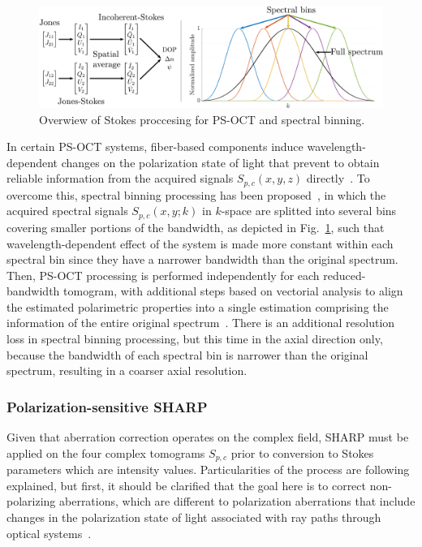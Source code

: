 \begin{figure}[htb!]
	\centering
	\includegraphics[width=\textwidth]{Figures/SHARP/PSOCT-Processing.pdf}
	\caption[Overwiew of Stokes processing for PS-OCT and spectral binning.]{Overwiew of Stokes proccesing for PS-OCT and spectral binning.}
	\label{fig:PSOCTProc}
\end{figure}

In certain PS-OCT systems, fiber-based components induce wavelength-dependent changes on the polarization state of light that prevent to obtain reliable information from the acquired signals $S_{p,c}(x,y,z)$ directly~\cite{deBoer2017_Polarization}. To overcome this, spectral binning processing has been proposed~\cite{Villiger2013_Spectral}, in which the acquired spectral signals $S_{p,c}(x,y;k)$ in $k$-space are splitted into several bins covering smaller portions of the bandwidth, as depicted in Fig.~\ref{fig:PSOCTProc}, such that wavelength-dependent effect of the system is made more constant within each spectral bin since they have a narrower bandwidth than the original spectrum. Then, PS-OCT processing is performed independently for each reduced-bandwidth tomogram, with additional steps based on vectorial analysis to align the estimated polarimetric properties into a single estimation comprising the information of the entire original spectrum~\cite{Villiger2013_Spectral}. There is an additional resolution loss in spectral binning processing, but this time in the axial direction only, because the bandwidth of each spectral bin is narrower than the original spectrum, resulting in a coarser axial resolution.

\subsubsection{Polarization-sensitive SHARP}

Given that aberration correction operates on the complex field, SHARP must be applied on the four complex tomograms $S_{p,c}$ prior to conversion to Stokes parameters which are intensity values. Particularities of the process are following explained, but first, it should be clarified that the goal here is to correct non-polarizing aberrations, which are different to polarization aberrations that include changes in the polarization state of light associated with ray paths through optical systems~\cite{Chipman1989_Polarization}.


